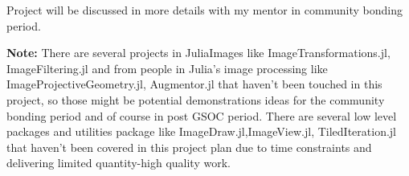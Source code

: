 
Project will be discussed in more details with my mentor in community bonding period.

\vspace{0.3cm}
\textbf{Note: }There are several projects in JuliaImages like ImageTransformations.jl, ImageFiltering.jl and from people in Julia's image processing like ImageProjectiveGeometry.jl, Augmentor.jl  that haven't been touched in this project, so those might be potential demonstrations ideas for the community bonding period and of course in post GSOC period. There are several low level packages and utilities package like ImageDraw.jl,ImageView.jl, TiledIteration.jl that haven't been covered in this project plan due to time constraints and delivering limited quantity-high quality work.


